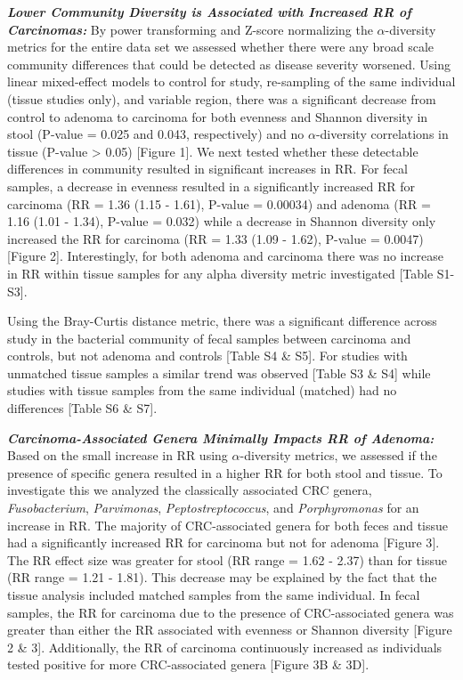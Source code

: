 \documentclass[12pt,]{article}
\begin{document}
\textbf{\emph{Lower Community Diversity is Associated with Increased RR
of Carcinomas:}} By power transforming and Z-score normalizing the
\(\alpha\)-diversity metrics for the entire data set we assessed whether
there were any broad scale community differences that could be detected
as disease severity worsened. Using linear mixed-effect models to
control for study, re-sampling of the same individual (tissue studies
only), and variable region, there was a significant decrease from
control to adenoma to carcinoma for both evenness and Shannon diversity
in stool (P-value = 0.025 and 0.043, respectively) and no
\(\alpha\)-diversity correlations in tissue (P-value \textgreater{}
0.05) {[}Figure 1{]}. We next tested whether these detectable
differences in community resulted in significant increases in RR. For
fecal samples, a decrease in evenness resulted in a significantly
increased RR for carcinoma (RR = 1.36 (1.15 - 1.61), P-value = 0.00034)
and adenoma (RR = 1.16 (1.01 - 1.34), P-value = 0.032) while a decrease
in Shannon diversity only increased the RR for carcinoma (RR = 1.33
(1.09 - 1.62), P-value = 0.0047) {[}Figure 2{]}. Interestingly, for both
adenoma and carcinoma there was no increase in RR within tissue samples
for any alpha diversity metric investigated {[}Table S1-S3{]}.

Using the Bray-Curtis distance metric, there was a significant
difference across study in the bacterial community of fecal samples
between carcinoma and controls, but not adenoma and controls {[}Table S4
\& S5{]}. For studies with unmatched tissue samples a similar trend was
observed {[}Table S3 \& S4{]} while studies with tissue samples from the
same individual (matched) had no differences {[}Table S6 \& S7{]}.

\textbf{\emph{Carcinoma-Associated Genera Minimally Impacts RR of
Adenoma:}} Based on the small increase in RR using \(\alpha\)-diversity
metrics, we assessed if the presence of specific genera resulted in a
higher RR for both stool and tissue. To investigate this we analyzed the
classically associated CRC genera, \emph{Fusobacterium},
\emph{Parvimonas}, \emph{Peptostreptococcus}, and \emph{Porphyromonas}
for an increase in RR. The majority of CRC-associated genera for both
feces and tissue had a significantly increased RR for carcinoma but not
for adenoma {[}Figure 3{]}. The RR effect size was greater for stool (RR
range = 1.62 - 2.37) than for tissue (RR range = 1.21 - 1.81). This
decrease may be explained by the fact that the tissue analysis included
matched samples from the same individual. In fecal samples, the RR for
carcinoma due to the presence of CRC-associated genera was greater than
either the RR associated with evenness or Shannon diversity {[}Figure 2
\& 3{]}. Additionally, the RR of carcinoma continuously increased as
individuals tested positive for more CRC-associated genera {[}Figure 3B
\& 3D{]}.
\end{document}
